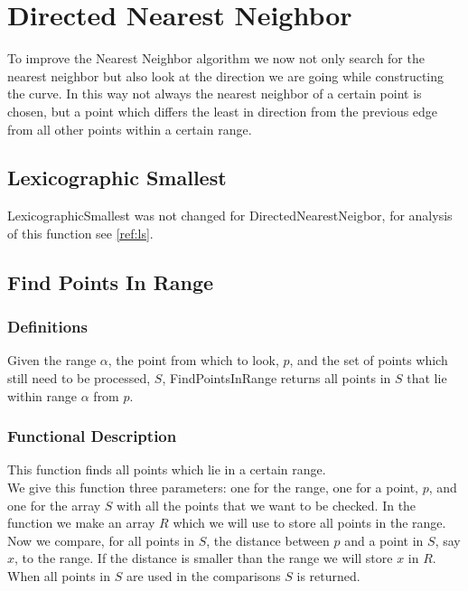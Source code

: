 \chapter{Directed Nearest Neighbor}
\label{cha:directed_nearest_neighbor}
To improve the Nearest Neighbor algorithm we now not only search for the nearest neighbor but also look at the direction we are going while constructing the curve. In this way not always the nearest neighbor of a certain point is chosen, but a point which differs the least in direction from the previous edge from all other points within a certain range.

  \section{Lexicographic Smallest}
  \label{sec:lexicographic_smallest}
    LexicographicSmallest was not changed for DirectedNearestNeigbor, for analysis of this function see \ref{ref:ls}.

  \section{Find Points In Range}
  \label{sec:find_points_in_range}

    \subsection{Definitions}
    \label{sub:definitions}
      \begin{definition} \label{def:fpir}
          Given the range $\alpha$, the point from which to look, $p$, and the set of points which still need to be processed, $S$, FindPointsInRange returns all points in $S$ that lie within range $\alpha$ from $p$.
      \end{definition}
      
    \subsection{Functional Description}
    \label{sub:functional_description}
      This function finds all points which lie in a certain range.\\
      We give this function three parameters: one for the range, one for a point, $p$, and one for the array $S$ with all the points that we want to be checked. In the function we make an array $R$ which we will use to store all points in the range.\\
      Now we compare, for all points in $S$, the distance between $p$ and a point in $S$, say $x$, to the range. If the distance is smaller than the range we will store $x$ in $R$.\\
      When all points in $S$ are used in the comparisons $S$ is returned.

